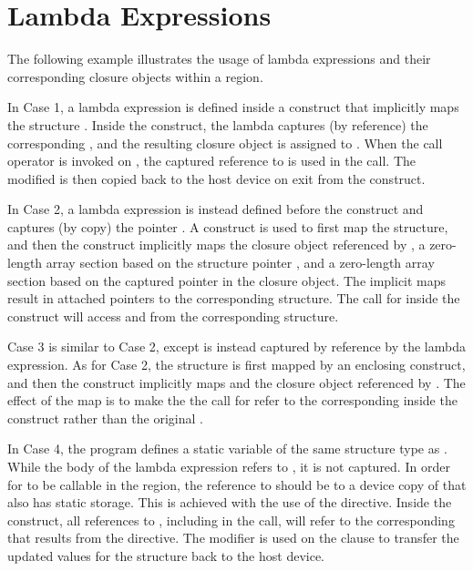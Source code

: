 \section{Lambda Expressions}
\label{sec:lambda_expressions}



\cppspecificstart
The following example illustrates the usage of lambda expressions and their
corresponding closure objects within a  region.

In Case 1, a lambda expression is defined inside a  construct
that implicitly maps the structure . Inside the construct, the
lambda captures (by reference) the corresponding , and the resulting
closure object is assigned to .  When the call operator is
invoked on , the captured reference to  is used in
the call.  The modified  is then copied back to the host device on
exit from the  construct.

In Case 2, a lambda expression is instead defined before the 
construct and captures (by copy) the pointer . A
 construct is used to first map the structure, and
then the  construct implicitly maps the closure object
referenced by , a zero-length array section based on the
structure pointer , and a zero-length array section based on the
captured pointer in the closure object. The implicit maps result in attached
pointers to the corresponding structure. The call for  inside
the  construct will access  and 
from the corresponding structure.

Case 3 is similar to Case 2, except  is instead captured by
reference by the lambda expression. As for Case 2, the structure is first
mapped by an enclosing  construct, and then the
 construct implicitly maps  and the closure object
referenced by . The effect of the map is to make the
the call for  refer to the corresponding  inside the
 construct rather than the original .

In Case 4, the program defines a static variable  of the same
structure type as . While the body of the lambda expression refers
to , it is not captured. In order for  to be
callable in the  region, the reference to  should be
to a device copy of  that also has static storage. This is achieved
with the use of the  directive.  Inside the
 construct, all references to , including in the
 call, will refer to the corresponding  that
results from the  directive. The 
modifier is used on the  clause to transfer the updated values for
the structure back to the host device.

\cppspecificend
